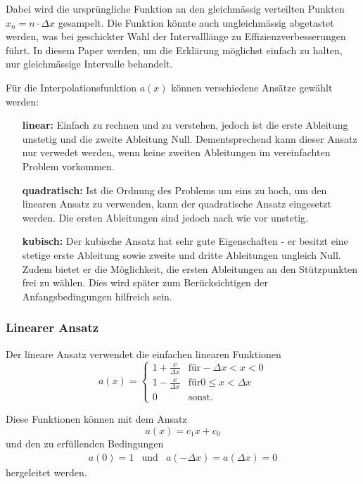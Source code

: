 Dabei wird die ursprüngliche Funktion an den gleichmässig verteilten Punkten $x_n = n \cdot \Delta x$ gesampelt. 
Die Funktion könnte auch ungleichmässig abgetastet werden, was bei geschickter Wahl der Intervalllänge zu Effizienzverbesserungen führt.
In diesem Paper werden, um die Erklärung möglichst einfach zu halten, nur gleichmässige Intervalle behandelt. 

Für die Interpolationsfunktion $a(x)$ können verschiedene Ansätze gewählt werden:
\begin{itemize}
    \item[\textbf{linear:}] 
        Einfach zu rechnen und zu verstehen, jedoch ist die erste Ableitung unstetig und die zweite Ableitung Null.
        Dementsprechend kann dieser Ansatz nur verwedet werden, wenn keine zweiten Ableitungen im vereinfachten Problem vorkommen.
    \item[\textbf{quadratisch:}]
        Ist die Ordnung des Problems um eins zu hoch, um den linearen Ansatz zu verwenden, kann der quadratische Ansatz eingesetzt werden.
        Die ersten Ableitungen sind jedoch nach wie vor unstetig.
    \item[\textbf{kubisch:}]  
        Der kubische Ansatz hat sehr gute Eigenschaften - er besitzt eine stetige erste Ableitung sowie zweite und dritte Ableitungen ungleich Null. 
        Zudem bietet er die Möglichkeit, die ersten Ableitungen an den Stützpunkten frei zu wählen.
        Dies wird später zum Berücksichtigen der Anfangsbedingungen hilfreich sein.
\end{itemize}

\subsubsection{Linearer Ansatz}
Der lineare Ansatz verwendet die einfachen linearen Funktionen
\begin{equation}
    a(x) = \left\{ \begin{array}{ll}
        1+\frac{x}{\Delta x} & \text{für} -\Delta x < x < 0 \\
        1-\frac{x}{\Delta x} & \text{für} 0 \leq x < \Delta x \\
        0                    & \text{sonst}.
    \end{array} \right.
\end{equation}

Diese Funktionen können mit dem Ansatz 
\begin{equation}
    a(x) = c_1x + c_0 %
\end{equation}
und den zu erfüllenden Bedingungen
\begin{equation}
    \begin{array}{ccc}
        a(0) = 1 & \text{und} & a(-\Delta x) = a(\Delta x) = 0
    \end{array}
\end{equation}
hergeleitet werden.

